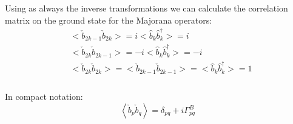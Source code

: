 \documentclass[10pt,a4paper]{article}
\begin{document}
Using as always the inverse transformations we can calculate the correlation matrix on the ground state for the Majorana operators:
\begin{equation}\begin{split}
&<\check{b}_{2k-1}\check{b}_{2k}>=i<\hat{b}_k\hat{b}_k^\dagger>=i\\ &<\check{b}_{2k}\check{b}_{2k-1}>=-i<\hat{b}_k\hat{b}_k^\dagger>=-i \\&<\check{b}_{2k}\check{b}_{2k}>=<\check{b}_{2k-1}\check{b}_{2k-1}>=<\hat{b}_k\hat{b}_k^\dagger>=1\\
\end{split}
\end{equation}\\
In compact notation:
\begin{equation}
\left\langle\check{b}_{p} \check{b}_{q}\right\rangle=\delta_{p q}+i \Gamma_{p q}^{B}
\end{equation}
\end{document}
